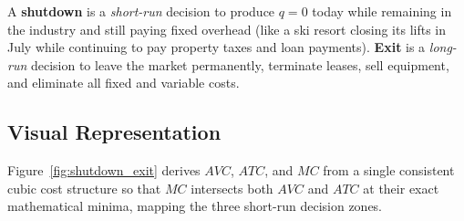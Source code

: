 \documentclass[11pt,letterpaper]{article}
\begin{document}
\begin{tcolorbox}[colback=LightTerracotta,colframe=CourseOrange,title=\textbf{Clear It Up: Shutdown Is Temporary; Exit Is Permanent}]
A \textbf{shutdown} is a \emph{short-run} decision to produce $q = 0$ today while remaining in the industry and still paying fixed overhead (like a ski resort closing its lifts in July while continuing to pay property taxes and loan payments). \textbf{Exit} is a \emph{long-run} decision to leave the market permanently, terminate leases, sell equipment, and eliminate all fixed and variable costs.
\end{tcolorbox}

\subsection*{Visual Representation}
Figure~\ref{fig:shutdown_exit} derives $AVC$, $ATC$, and $MC$ from a single consistent cubic cost structure so that $MC$ intersects both $AVC$ and $ATC$ at their exact mathematical minima, mapping the three short-run decision zones.
\end{document}
